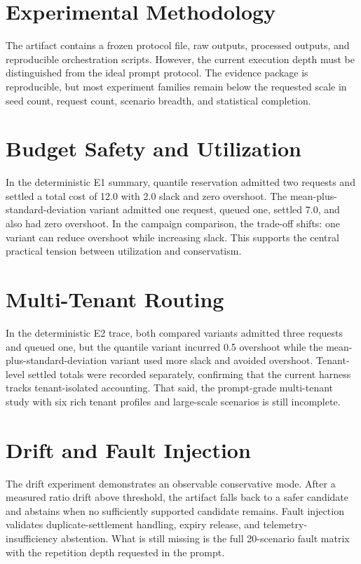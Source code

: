 \documentclass[10pt,journal,compsoc]{IEEEtran}
\begin{document}
\section{Experimental Methodology}
The artifact contains a frozen protocol file, raw outputs, processed outputs,
and reproducible orchestration scripts. However, the current execution depth
must be distinguished from the ideal prompt protocol. The evidence package is
reproducible, but most experiment families remain below the requested scale in
seed count, request count, scenario breadth, and statistical completion.

\section{Budget Safety and Utilization}
In the deterministic E1 summary, quantile reservation admitted two requests and
settled a total cost of 12.0 with 2.0 slack and zero overshoot. The
mean-plus-standard-deviation variant admitted one request, queued one, settled
7.0, and also had zero overshoot. In the campaign comparison, the trade-off
shifts: one variant can reduce overshoot while increasing slack. This supports
the central practical tension between utilization and conservatism.

\section{Multi-Tenant Routing}
In the deterministic E2 trace, both compared variants admitted three requests
and queued one, but the quantile variant incurred 0.5 overshoot while the
mean-plus-standard-deviation variant used more slack and avoided overshoot.
Tenant-level settled totals were recorded separately, confirming that the
current harness tracks tenant-isolated accounting. That said, the prompt-grade
multi-tenant study with six rich tenant profiles and large-scale scenarios is
still incomplete.

\section{Drift and Fault Injection}
The drift experiment demonstrates an observable conservative mode. After a
measured ratio drift above threshold, the artifact falls back to a safer
candidate and abstains when no sufficiently supported candidate remains. Fault
injection validates duplicate-settlement handling, expiry release, and
telemetry-insufficiency abstention. What is still missing is the full
20-scenario fault matrix with the repetition depth requested in the prompt.
\end{document}
